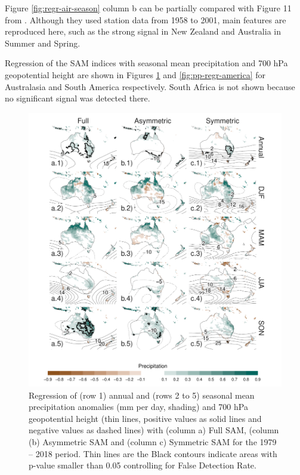 \documentclass[]{ametsocV5}
\begin{document}
Figure \ref{fig:regr-air-season} column b can be partially compared with Figure 11 from \citet{fogt2012}. Although they used station data from 1958 to 2001, main features are reproduced here, such as the strong signal in New Zealand and Australia in Summer and Spring.

Regression of the SAM indices with seasonal mean precipitation and 700 hPa geopotential height are shown in Figures \ref{fig:pp-regr-oceania} and \ref{fig:pp-regr-america} for Australasia and South America respectively. South Africa is not shown because no significant signal was detected there.

\begin{figure}
\includegraphics{pp-regr-oceania-1} \caption[Regression of (row 1) annual and (rows 2 to 5) seasonal mean precipitation anomalies (mm per day, shading) and 700 hPa geopotential height (thin lines, positive values as solid lines and negative values as dashed lines) with (column a) Full SAM, (column (b) Asymmetric SAM and (column c) Symmetric SAM for the 1979 -- 2018 period]{Regression of (row 1) annual and (rows 2 to 5) seasonal mean precipitation anomalies (mm per day, shading) and 700 hPa geopotential height (thin lines, positive values as solid lines and negative values as dashed lines) with (column a) Full SAM, (column (b) Asymmetric SAM and (column c) Symmetric SAM for the 1979 -- 2018 period. Thin lines are the Black contours indicate areas with p-value smaller than 0.05 controlling for False Detection Rate.}\label{fig:pp-regr-oceania}
\end{figure}
\end{document}
